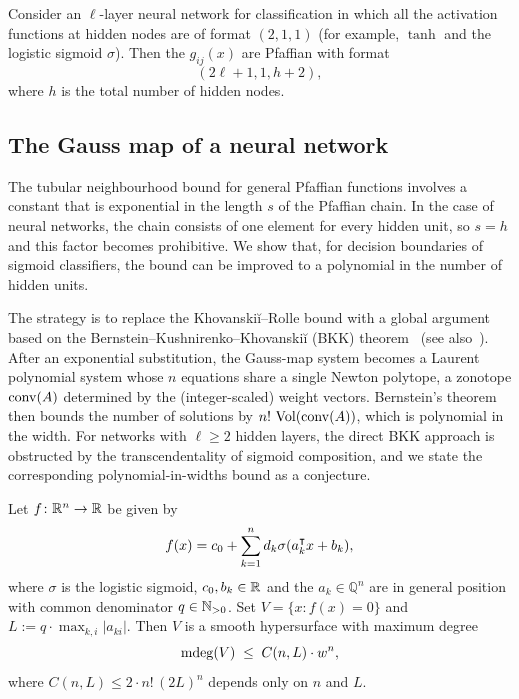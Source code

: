 \begin{example}
Consider an $\ell$-layer neural network for classification in which all the activation functions at hidden nodes are of format $(2,1,1)$ (for example, $\tanh$ and the logistic sigmoid $\sigma$). Then the $g_{ij}(x)$ are Pfaffian with format
\begin{equation*}
  (2\ell+1, 1, h+2),
\end{equation*}
where $h$ is the total number of hidden nodes.
\end{example}

\subsection{The Gauss map of a neural network}
The tubular neighbourhood bound for general Pfaffian functions involves a constant that is exponential in the length $s$ of the Pfaffian chain. In the case of neural networks, the chain consists of one element for every hidden unit, so $s=h$ and this factor becomes prohibitive. We show that, for decision boundaries of sigmoid classifiers, the bound can be improved to a polynomial in the number of hidden units.

The strategy is to replace the Khovanski\u i--Rolle bound with a global argument based on the Bernstein--Kushnirenko--Khovanski\u i (BKK) theorem~\cite{bernstein1975} (see also~\cite[Chapter 7,\S 5]{cox2005using}). After an exponential substitution, the Gauss-map system becomes a Laurent polynomial system whose $n$ equations share a single Newton polytope, a zonotope $\operatorname{conv}(A)$ determined by the (integer-scaled) weight vectors. Bernstein's theorem then bounds the number of solutions by $n!\,\operatorname{Vol}(\operatorname{conv}(A))$, which is polynomial in the width. For networks with $\ell\geq 2$ hidden layers, the direct BKK approach is obstructed by the transcendentality of sigmoid composition, and we state the corresponding polynomial-in-widths bound as a conjecture.


\begin{proposition}\label{prop:single-layer-degree}
  Let $f\colon \mathbb{R}^n \to \mathbb{R}$ be given by
  \begin{equation*}
  f(x) = c_0+\sum_{k=1}^n d_k \sigma(a_k^{\intercal}x+b_k), 
  \end{equation*}
  where $\sigma$ is the logistic sigmoid, $c_0,b_k\in \mathbb{R}$ and the $a_k\in \mathbb{Q}^{n}$ are in general position with common denominator $q\in\mathbb{N}_{>0}$. Set $V=\{x\colon f(x)=0\}$ and $L := q\cdot\max_{k,i}|a_{ki}|$. 
  Then $V$ is a smooth hypersurface with maximum degree
  \begin{equation}\label{eq:single-layer-bound}
    \operatorname{\mathrm{mdeg}}(V) \;\leq\; C(n,L)\cdot w^{n},
  \end{equation}
  where $C(n,L)\leq 2\cdot n!\,(2L)^n$ depends only on $n$ and $L$.
\end{proposition}

